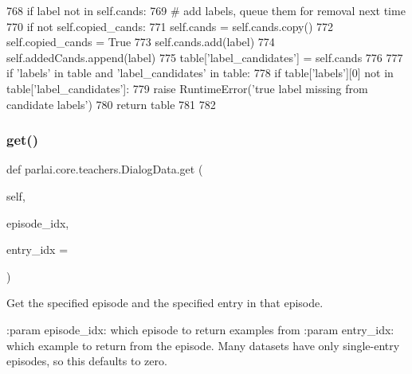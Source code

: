 \begin{DoxyCode}
768                 \textcolor{keywordflow}{if} label \textcolor{keywordflow}{not} \textcolor{keywordflow}{in} self.cands:
769                     \textcolor{comment}{# add labels, queue them for removal next time}
770                     \textcolor{keywordflow}{if} \textcolor{keywordflow}{not} self.copied\_cands:
771                         self.cands = self.cands.copy()
772                         self.copied\_cands = \textcolor{keyword}{True}
773                     self.cands.add(label)
774                     self.addedCands.append(label)
775             table[\textcolor{stringliteral}{'label\_candidates'}] = self.cands
776 
777         \textcolor{keywordflow}{if} \textcolor{stringliteral}{'labels'} \textcolor{keywordflow}{in} table \textcolor{keywordflow}{and} \textcolor{stringliteral}{'label\_candidates'} \textcolor{keywordflow}{in} table:
778             \textcolor{keywordflow}{if} table[\textcolor{stringliteral}{'labels'}][0] \textcolor{keywordflow}{not} \textcolor{keywordflow}{in} table[\textcolor{stringliteral}{'label\_candidates'}]:
779                 \textcolor{keywordflow}{raise} RuntimeError(\textcolor{stringliteral}{'true label missing from candidate labels'})
780         \textcolor{keywordflow}{return} table
781 
782 
\end{DoxyCode}
\mbox{\label{classparlai_1_1core_1_1teachers_1_1DialogData_a1e037df2f18a67503db657ae4cc27ab4}} 
\subsubsection{\texorpdfstring{get()}{get()}}
{\footnotesize\ttfamily def parlai.\+core.\+teachers.\+Dialog\+Data.\+get (\begin{DoxyParamCaption}\item[{}]{self,  }\item[{}]{episode\+\_\+idx,  }\item[{}]{entry\+\_\+idx = {} }\end{DoxyParamCaption})}

\begin{DoxyVerb}Get the specified episode and the specified entry in that episode.

:param episode_idx:
    which episode to return examples from
:param entry_idx:
    which example to return from the episode. Many datasets have only
    single-entry episodes, so this defaults to zero.
\end{DoxyVerb}
 

